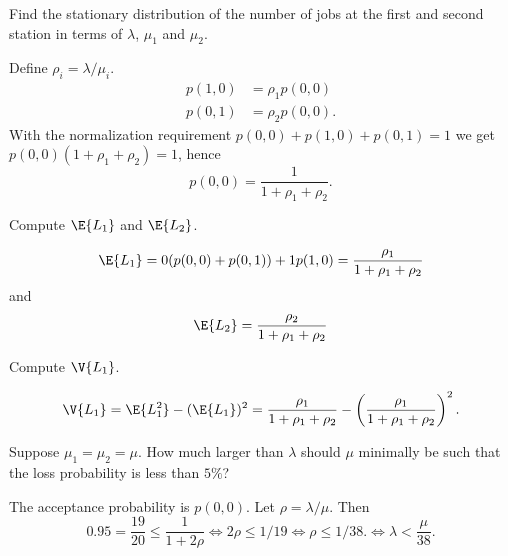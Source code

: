 \begin{exercise}[201704]{2}
  Find the stationary distribution of the number of jobs at the first
  and second station in terms of $\lambda$, $\mu_1$ and $\mu_2$.
\begin{solution}
Define $\rho_i=\lambda/\mu_i$.
  \begin{align*}
     p(1,0) &= \rho_1 p(0,0) \\
     p(0,1) &= \rho_2 p(0,0).
  \end{align*}
With the normalization requirement $p(0,0)+p(1,0)+p(0,1) = 1$ we get
$p(0,0)(1 + \rho_1 + \rho_2) = 1$, hence
\begin{equation*}
p(0,0)=\frac1{1 + \rho_1 + \rho_2}.
\end{equation*}
\end{solution}
\end{exercise}

\begin{exercise}[201704]{2}
  Compute  $\E{L_1}$ and $\E{L_2}$.
\begin{solution}
    \begin{equation*}
    \E{L_1} = 0 (p(0,0) + p(0,1)) + 1 p(1,0) = \frac{\rho_1}{1+\rho_1 + \rho_2}
    \end{equation*}
and
    \begin{equation*}
    \E{L_2} = \frac{\rho_2}{1+\rho_1 + \rho_2}
    \end{equation*}
\end{solution}
\end{exercise}

\begin{exercise}[201704]{2}
  Compute  $\V{L_1}$.
\begin{solution}
    \begin{equation*}
      \V{L_1} = \E{L_1^2} - (\E{L_1})^2= \frac{\rho_1}{1+\rho_1 + \rho_2} - \left(\frac{\rho_1}{1+\rho_1 + \rho_2}\right)^2.
    \end{equation*}
\end{solution}
\end{exercise}

\begin{exercise}[201704]
  Suppose $\mu_1=\mu_2=\mu$. How much larger than $\lambda$ should
  $\mu$ minimally be such that the loss probability is less than
  $5\%$?
\begin{solution}
    The acceptance probability is $p(0,0)$. Let $\rho=\lambda/\mu$. Then
    \begin{equation*}
      0.95 =\frac{19}{20}\leq \frac1{1+2\rho} \iff 2\rho \leq 1/19 \iff \rho \leq 1/38.
    \iff \lambda < \frac{\mu}{38}.
\end{equation*}
\end{solution}
\end{exercise}


